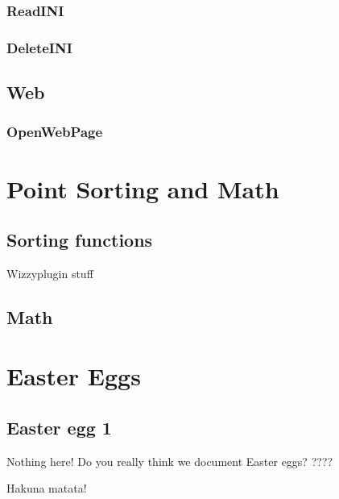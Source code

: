 \documentclass[a4paper]{report}
\begin{document}
\subsection{ReadINI}
\subsection{DeleteINI}

\section{Web}

\subsection{OpenWebPage}

\chapter{Point Sorting and Math}
\section{Sorting functions}
Wizzyplugin stuff

\section{Math}

\chapter{Easter Eggs}
\section{Easter egg 1}
Nothing here! Do you really think we document Easter eggs?
????

Hakuna matata!
\end{document}
